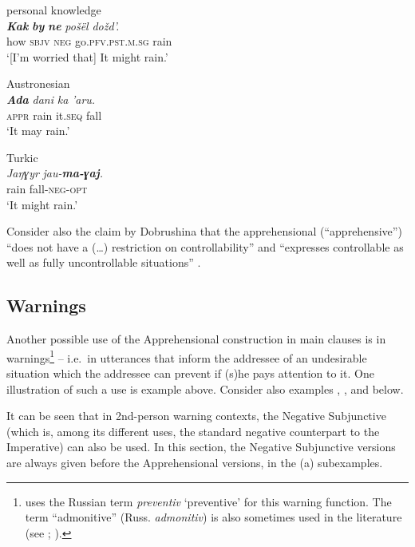 \documentclass[output=paper,colorlinks,citecolor=brown
]{langscibook}
\begin{document}
\ea \label{ex:Fed21}  {} {personal knowledge} \\
\gll \textit{\textbf{Kak}} \textit{\textbf{by}} \textit{\textbf{ne}} \textit{pošël} \textit{dožd'.} \\
how \textsc{sbjv} \textsc{neg} go.\textsc{pfv.pst.m.sg} rain \\
\glt `[I'm worried that] It might rain.'
\z


\ea \label{ex:Fed22} 
 {Austronesian}{\citealt[295]{lichtenberk1995}}  \\
\gll \textit{\textbf{Ada}} \textit{dani} \textit{ka} \textit{'aru.} \\
\textsc{appr} rain it.\textsc{seq} fall \\
\glt `It may rain.'
\z


\ea \label{ex:Fed23}  {Turkic} {\citealt[33]{Dobrushina2006}} \\
\gll \textit{Jaŋɣyr} \textit{jau-\textbf{ma-ɣaj}.} \\
rain fall-\textsc{neg-opt} \\
\glt `It might rain.'
\z

 Consider also the claim by Dobrushina that the apprehensional (``apprehensive'') ``does not have a (\dots) restriction on controllability'' and ``expresses controllable as well as fully uncontrollable situations'' \citep[57--59]{Dobrushina2006}.


\subsection{Warnings}
\label{subsec:warnings}

Another possible use of the Apprehensional construction in main clauses is in warnings\footnote{\citet{Dobrushina2006} uses the Russian term \textit{preventiv} `preventive' for this warning function. The term ``admonitive'' (Russ. \textit{admonitiv}) is also sometimes used in the literature (see \cite[39--40]{vuillermet2018}; \cite[29]{Dobrushina2006}).} -- i.e.\ in utterances that inform the addressee of an undesirable situation which the addressee can prevent if (s)he pays attention to it. One illustration of such a use is example  above. Consider also examples , , and  below.

It can be seen that in 2nd-person warning contexts, the Negative Subjunctive (which is, among its different uses, the standard negative counterpart to the Imperative) can also be used. In this section, the Negative Subjunctive versions are always given before the Apprehensional versions, in the (a) subexamples.
\end{document}
